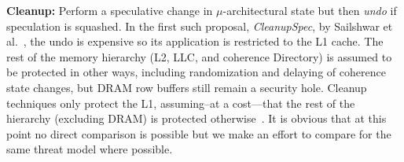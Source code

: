 \item{\textbf{Cleanup:}} Perform a speculative change in $\mu$-architectural state but then \emph{undo} if speculation is squashed. In the first such proposal, \emph{CleanupSpec}, by Sailshwar et al.~\cite{saileshwar2019cleanupspec}, the undo is expensive so its application is restricted to the L1 cache. The rest of the memory hierarchy (L2, LLC, and coherence Directory) is assumed to be protected in other ways, including randomization and delaying of coherence state changes, but DRAM row buffers still remain a security hole.
Cleanup techniques only protect the L1, assuming--at a cost---that the rest of the hierarchy (excluding DRAM) is protected otherwise~\cite{saileshwar2019cleanupspec}. 
\squishend
{\color{red} It is obvious that at this point no direct comparison is possible but we make an effort to compare for the same threat model where possible.}



